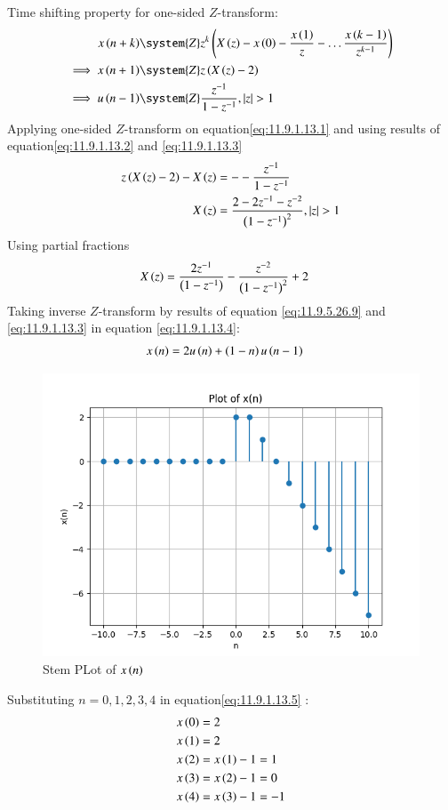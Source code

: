\documentclass[journal,12pt,twocolumn]{IEEEtran}
\theoremstyle{remark}
\begin{document}
Time shifting property for one-sided $Z$-transform:
\begin{align}
x\brak{n+k}&\system{Z} z^{k}\brak{X\brak{z}-x\brak{0}-\frac{x\brak{1}}{z}-\ldots \frac{x\brak{k-1}}{z^{k-1}}}\label{eq:one-sided-shiftk}\\
\implies x\brak{n+1} &\system{Z} z\brak{X\brak{z}-2}\label{eq:11.9.1.13.2}\\
\implies u\brak{n-1} &\system{Z} \frac{z^{-1}}{1-z^{-1}},\abs{z}>1 \label{eq:11.9.1.13.3}
\end{align}
Applying one-sided $Z$-transform on equation\eqref{eq:11.9.1.13.1} and using results of equation\eqref{eq:11.9.1.13.2} and \eqref{eq:11.9.1.13.3}
\begin{align}
 z\left(X\left(z\right)-2\right) - X\left(z\right) &= --\frac{z^{-1}}{1-z^{-1}}\\
    X\left(z\right) &= \frac{2-2z^{-1}-z^{-2}}{\left(1-z^{-1}\right)^2}  ,   \left\vert z\right\vert >1
\end{align}
Using partial fractions
\begin{align}
    X\left(z\right) &= \frac{2z^{-1}}{\left(1-z^{-1}\right)} - \frac{z^{-2}}{\left(1-z^{-1}\right)^2} + 2\label{eq:11.9.1.13.4}
\end{align}
Taking inverse $Z$-transform by results of equation \eqref{eq:11.9.5.26.9} and \eqref{eq:11.9.1.13.3} in equation \eqref{eq:11.9.1.13.4}:
\begin{align}
    x\left(n\right) &= 2u\left(n\right)+\left(1-n\right)u\left(n-1\right)\label{eq:11.9.1.13.5}
\end{align}
\begin{figure}[H]
	\centering
	\includegraphics[width=1\columnwidth]{figs/fig_x(n).png}
	\caption{Stem PLot of $x\left(n\right)$}
	\label{fig:x(n)}
\end{figure}
Substituting $n=0,1,2,3,4$ in equation\eqref{eq:11.9.1.13.5} :
\begin{align}
    x\left(0\right) &= 2\\
    x\left(1\right) &= 2\\
    x\left(2\right) &= x\left(1\right) - 1 = 1  \\
    x\left(3\right) &= x\left(2\right) - 1 = 0\\
    x\left(4\right) &= x\left(3\right) - 1 = -1 
\end{align}
\end{document}

